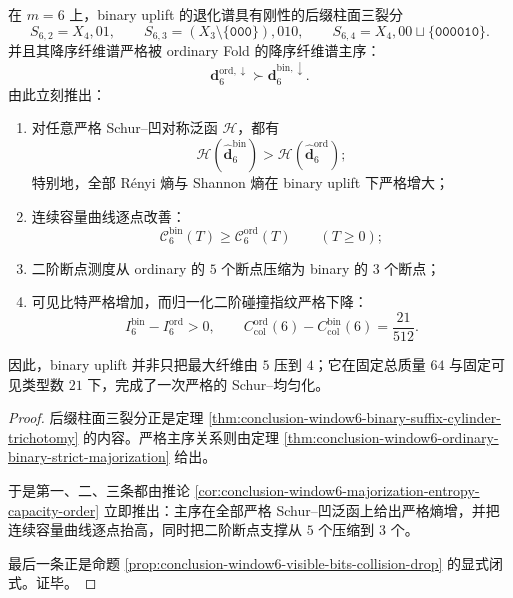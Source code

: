 \begin{theorem}\label{thm:conclusion-window6-binary-uplift-strict-schur-uniformizer}
在 \(m=6\) 上，binary uplift 的退化谱具有刚性的后缀柱面三裂分
\[
S_{6,2}=X_4,01,
\qquad
S_{6,3}=(X_3\setminus\{\texttt{000}\}),010,
\qquad
S_{6,4}=X_4,00\sqcup\{\texttt{000010}\}.
\]
并且其降序纤维谱严格被 ordinary Fold 的降序纤维谱主序：
\[
\mathbf d_6^{\mathrm{ord},\downarrow}\succ \mathbf d_6^{\mathrm{bin},\downarrow}.
\]
由此立刻推出：
\begin{enumerate}
  \item 对任意严格 Schur--凹对称泛函 \(\mathcal H\)，都有
  \[
  \mathcal H(\widehat{\mathbf d}_6^{\mathrm{bin}})
  >
  \mathcal H(\widehat{\mathbf d}_6^{\mathrm{ord}});
  \]
  特别地，全部 Rényi 熵与 Shannon 熵在 binary uplift 下严格增大；
  \item 连续容量曲线逐点改善：
  \[
  \mathcal C_6^{\mathrm{bin}}(T)\ge \mathcal C_6^{\mathrm{ord}}(T)\qquad(T\ge 0);
  \]
  \item 二阶断点测度从 ordinary 的 \(5\) 个断点压缩为 binary 的 \(3\) 个断点；
  \item 可见比特严格增加，而归一化二阶碰撞指纹严格下降：
  \[
  I_6^{\mathrm{bin}}-I_6^{\mathrm{ord}}>0,
  \qquad
  C_{\mathrm{col}}^{\mathrm{ord}}(6)-C_{\mathrm{col}}^{\mathrm{bin}}(6)=\frac{21}{512}.
  \]
\end{enumerate}
因此，binary uplift 并非只把最大纤维由 \(5\) 压到 \(4\)；它在固定总质量 \(64\) 与固定可见类型数 \(21\) 下，完成了一次严格的 Schur--均匀化。
\end{theorem}
\begin{proof}
后缀柱面三裂分正是定理 \ref{thm:conclusion-window6-binary-suffix-cylinder-trichotomy} 的内容。严格主序关系则由定理 \ref{thm:conclusion-window6-ordinary-binary-strict-majorization} 给出。

于是第一、二、三条都由推论 \ref{cor:conclusion-window6-majorization-entropy-capacity-order} 立即推出：主序在全部严格 Schur--凹泛函上给出严格熵增，并把连续容量曲线逐点抬高，同时把二阶断点支撑从 \(5\) 个压缩到 \(3\) 个。

最后一条正是命题 \ref{prop:conclusion-window6-visible-bits-collision-drop} 的显式闭式。证毕。
\end{proof}

